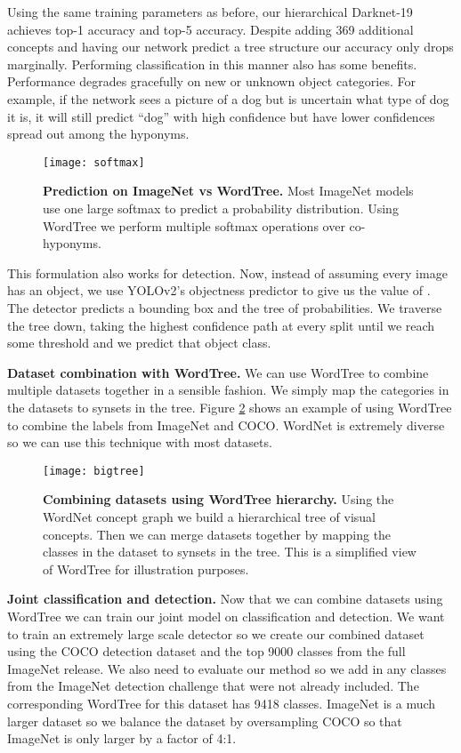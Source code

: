 \documentclass[10pt,twocolumn,letterpaper]{article}
\begin{document}
Using the same training parameters as before, our hierarchical Darknet-19 achieves  top-1 accuracy and  top-5 accuracy. Despite adding 369 additional concepts and having our network predict a tree structure our accuracy only drops marginally. Performing classification in this manner also has some benefits. Performance degrades gracefully on new or unknown object categories. For example, if the network sees a picture of a dog but is uncertain what type of dog it is, it will still predict ``dog'' with high confidence but have lower confidences spread out among the hyponyms.

\begin{figure}[t]
      \centering
        \texttt{[image: softmax]}
      \caption{\small \textbf{Prediction on ImageNet vs WordTree.} Most ImageNet models use one large softmax to predict a probability distribution. Using WordTree we perform multiple softmax operations over co-hyponyms.}
      \label{softmax}
   \end{figure}

This formulation also works for detection. Now, instead of assuming every image has an object, we use YOLOv2's objectness predictor to give us the value of . The detector predicts a bounding box and the tree of probabilities. We traverse the tree down, taking the highest confidence path at every split until we reach some threshold and we predict that object class.

\textbf{Dataset combination with WordTree.} We can use WordTree to combine multiple datasets together in a sensible fashion. We simply map the categories in the datasets to synsets in the tree. Figure \ref{tree} shows an example of using WordTree to combine the labels from ImageNet and COCO. WordNet is extremely diverse so we can use this technique with most datasets.

\begin{figure}[t]
      \centering
        \texttt{[image: bigtree]}
      \caption{\small \textbf{Combining datasets using WordTree hierarchy.} Using the WordNet concept graph we build a hierarchical tree of visual concepts. Then we can merge datasets together by mapping the classes in the dataset to synsets in the tree. This is a simplified view of WordTree for illustration purposes.}
      \label{tree}
   \end{figure}


\textbf{Joint classification and detection.} Now that we can combine datasets using WordTree we can train our joint model on classification and detection. We want to train an extremely large scale detector so we create our combined dataset using the COCO detection dataset and the top 9000 classes from the full ImageNet release. We also need to evaluate our method so we add in any classes from the ImageNet detection challenge that were not already included. The corresponding WordTree for this dataset has 9418 classes. ImageNet is a much larger dataset so we balance the dataset by oversampling COCO so that ImageNet is only larger by a factor of 4:1.
\end{document}
